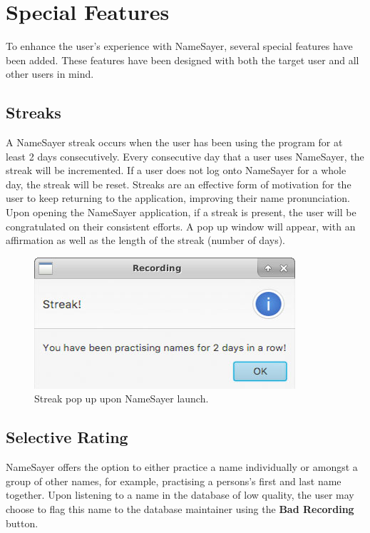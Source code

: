 \documentclass{article}
\begin{document}
\section{Special Features}
To enhance the user's experience with NameSayer, several special features have
been added. These features have been designed with both the target user and all
other users in mind.

\subsection{Streaks}
A NameSayer streak occurs when the user has been using the program for at least
2 days consecutively. Every consecutive day  that a user uses NameSayer, the
streak will be incremented. If a user does not log onto NameSayer for a whole
day, the  streak will be reset. Streaks are an effective form of motivation for
the user to keep returning to the application,  improving their name
pronunciation. \\

Upon opening the NameSayer application, if a streak is present, the user will be
congratulated on their consistent efforts. A pop up window will appear, with an
affirmation as well as the length of the streak (number of days).

\begin{figure}[H]
	\centerline{\includegraphics[width=\textwidth/2]{images/15_streak.jpg}}
	\caption{Streak pop up upon NameSayer launch.}
	\label{streak}
\end{figure}

\subsection{Selective Rating}
NameSayer offers the option to either practice a name individually or amongst a
group of other names, for example, practising a persons's first and last name
together. Upon listening to a name in the database of low quality, the user may
choose to flag this name to the database maintainer using the \textbf{Bad
Recording} button. \\
\end{document}
